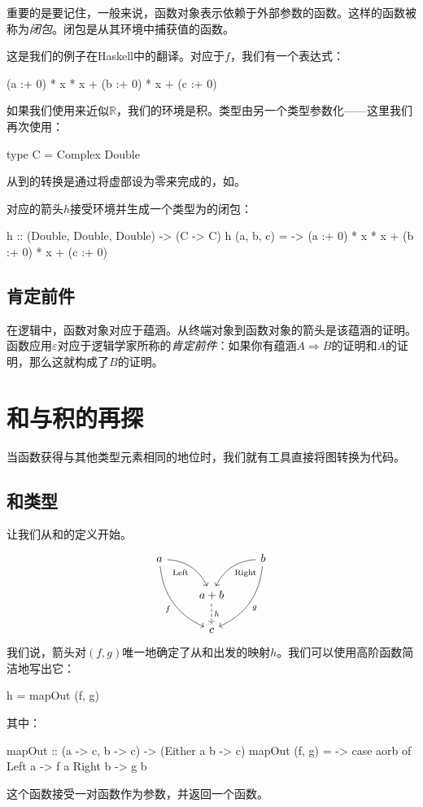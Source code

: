 \documentclass[DaoFP]{subfiles}
\begin{document}
重要的是要记住，一般来说，函数对象表示依赖于外部参数的函数。这样的函数被称为\emph{闭包}。闭包是从其环境中捕获值的函数。

这是我们的例子在Haskell中的翻译。对应于$f$，我们有一个表达式：
\begin{haskell}
(a :+ 0) * x * x + (b :+ 0) * x + (c :+ 0)
\end{haskell}
如果我们使用来近似$\mathbb{R}$，我们的环境是积。类型由另一个类型参数化——这里我们再次使用：
\begin{haskell}
type C = Complex Double
\end{haskell}
从到的转换是通过将虚部设为零来完成的，如。

对应的箭头$h$接受环境并生成一个类型为的闭包：
\begin{haskell}
h :: (Double, Double, Double) -> (C -> C)
h (a, b, c) = \x -> (a :+ 0) * x * x + (b :+ 0) * x + (c :+ 0)
\end{haskell}

\subsection{肯定前件}

在逻辑中，函数对象对应于蕴涵。从终端对象到函数对象的箭头是该蕴涵的证明。函数应用$\varepsilon$对应于逻辑学家所称的\emph{肯定前件}：如果你有蕴涵$A \Rightarrow B$的证明和$A$的证明，那么这就构成了$B$的证明。

\section{和与积的再探}

当函数获得与其他类型元素相同的地位时，我们就有工具直接将图转换为代码。

\subsection{和类型}

让我们从和的定义开始。
\[
 \begin{tikzcd}
 a
 \arrow[dr,  bend left, "\text{Left}"']
 \arrow[ddr, bend right, "f"']
 && b
 \arrow[dl, bend right, "\text{Right}"]
 \arrow[ddl, bend left, "g"]
 \\
&a + b
\arrow[d, dashed, "h"]
\\
& c
 \end{tikzcd}
\]
我们说，箭头对$(f, g)$唯一地确定了从和出发的映射$h$。我们可以使用高阶函数简洁地写出它：
\begin{haskell}
h = mapOut (f, g)
\end{haskell}
其中：
\begin{haskell}
mapOut :: (a -> c, b -> c) -> (Either a b -> c)
mapOut (f, g) = \aorb -> case aorb of
                         Left  a -> f a
                         Right b -> g b
\end{haskell}
这个函数接受一对函数作为参数，并返回一个函数。
\end{document}
